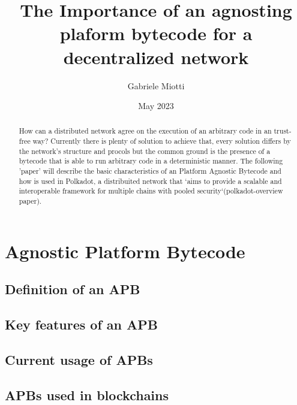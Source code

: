 \documentclass{article}
\title{The Importance of an agnosting plaform bytecode for a decentralized network}
\author{Gabriele Miotti}
\date{May 2023}
\begin{document}
\maketitle

\begin{abstract}

How can a distributed network agree on the execution of an arbitrary code in an trust-free way? Currently there is plenty of solution to achieve that, every solution differs by the network's structure and procols but the common ground is the presence of a bytecode that is able to run arbitrary code in a deterministic manner. The following 'paper' will describe the basic characteristics of an Platform Agnostic Bytecode and how is used in Polkadot, a distribuited network that `aims to provide a scalable and interoperable framework for multiple chains with pooled security`(polkadot-overview paper).

\end{abstract}

\tableofcontents

\section{Agnostic Platform Bytecode}
\subsection{Definition of an APB}
\subsection{Key features of an APB}
\subsection{Current usage of APBs}
\subsection{APBs used in blockchains}


\end{document}
